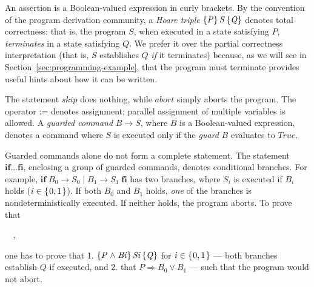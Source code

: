 \documentclass[runningheads]{llncs}
\newcommand{\Conid}[1]{\mathit{#1}}
\newcommand{\Varid}[1]{\mathit{#1}}
\def\resethooks{%
  \global\let\SaveRestoreHook\empty
  \global\let\ColumnHook\empty}
\let\hspre\empty
\let\hspost\empty
\let\Varid\mathit
\let\Conid\mathit
\newcounter{linenum}
\begin{document}
An assertion is a Boolean-valued expression in curly brackets.
By the convention of the program derivation community, a \emph{Hoare triple} \ensuremath{\htriple{\Conid{P}}{\Conid{S}}{\Conid{Q}}} denotes total correctness: that is, the program \ensuremath{\Conid{S}}, when executed in a state satisfying \ensuremath{\Conid{P}}, \emph{terminates} in a state satisfying \ensuremath{\Conid{Q}}.
We prefer it over the partial correctness interpretation (that is, \ensuremath{\Conid{S}} establishes \ensuremath{\Conid{Q}} \emph{if} it terminates) because, as we will see in Section~\ref{sec:programming-example}, that the program must terminate provides useful hints about how it can be written.

%

The statement \ensuremath{\Varid{skip}} does nothing, while \ensuremath{\Varid{abort}} simply aborts the program.
The operator \ensuremath{\mathbin{:=}} denotes assignment; parallel assignment of multiple variables is allowed.
A \emph{guarded command} \ensuremath{\Conid{B}\to \Conid{S}}, where \ensuremath{\Conid{B}} is a Boolean-valued expression, denotes a command where \ensuremath{\Conid{S}} is executed only if the \emph{guard} \ensuremath{\Conid{B}} evaluates to \ensuremath{\Conid{True}}.

Guarded commands alone do not form a complete statement.
The statement \ensuremath{\mathbf{if}\mathbin{...}\mathbf{fi}}, enclosing a group of guarded commands, denotes conditional branches.
For example, \ensuremath{\mathbf{if}\;\Conid{B}_{0}\to \Conid{S}_{0}\mid \Conid{B}_{1}\to \Conid{S}_{1}\;\mathbf{fi}} has two branches, where \ensuremath{\Conid{S}_{i}} is executed if \ensuremath{\Conid{B}_{i}} holds (\ensuremath{\Varid{i}\in \{\mskip1.5mu \mathrm{0},\mathrm{1}\mskip1.5mu\}}).
If both \ensuremath{\Conid{B}_{0}} and \ensuremath{\Conid{B}_{1}} holds, \emph{one} of the branches is nondeterministically executed.
If neither holds, the program aborts.
To prove that
\begin{hscode}\linenumsetup\printlinebegin\SaveRestoreHook
\column{B}{@{}>{\hspre}l<{\hspost}@{}}%
\column{E}{@{}>{\hspre}l<{\hspost}@{}}%
\>[B]{}\htriple{\Conid{P}}{\mathbf{if}\;\Conid{B}_{0}\to \Conid{S}_{0}\mid \Conid{B}_{1}\to \Conid{S}_{1}\;\mathbf{fi}}{\Conid{Q}}~~,{}\<[E]%
\printlineend\ColumnHook
\end{hscode}\resethooks
one has to prove that 1. \ensuremath{\htriple{\Conid{P}\mathrel{\wedge}\Conid{Bi}}{\Conid{Si}}{\Conid{Q}}} for \ensuremath{\Varid{i}\in \{\mskip1.5mu \mathrm{0},\mathrm{1}\mskip1.5mu\}} --- both branches establish \ensuremath{\Conid{Q}} if executed, and 2. that \ensuremath{\Conid{P}\mathrel{\Rightarrow}\Conid{B}_{0}\mathrel{\vee}\Conid{B}_{1}} --- such that the program would not abort.
\end{document}
